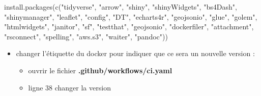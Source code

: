 \documentclass[
  letterpaper,
  DIV=11,
  numbers=noendperiod]{scrreprt}
\newenvironment{Shaded}{\begin{snugshade}}{\end{snugshade}}
\newcommand{\AttributeTok}[1]{\textcolor[rgb]{0.40,0.45,0.13}{#1}}
\newcommand{\CommentTok}[1]{\textcolor[rgb]{0.37,0.37,0.37}{#1}}
\newcommand{\FunctionTok}[1]{\textcolor[rgb]{0.28,0.35,0.67}{#1}}
\newcommand{\NormalTok}[1]{\textcolor[rgb]{0.00,0.23,0.31}{#1}}
\newcommand{\StringTok}[1]{\textcolor[rgb]{0.13,0.47,0.30}{#1}}
\providecommand{\tightlist}{%
  \setlength{\itemsep}{0pt}\setlength{\parskip}{0pt}}\usepackage{longtable,booktabs,array}
\begin{document}
\begin{Shaded}
\begin{Highlighting}[]
\FunctionTok{install.packages}\NormalTok{(}\FunctionTok{c}\NormalTok{(}\StringTok{"tidyverse"}\NormalTok{, }\StringTok{"arrow"}\NormalTok{, }\StringTok{"shiny"}\NormalTok{, }\StringTok{"shinyWidgets"}\NormalTok{, }\StringTok{"bs4Dash"}\NormalTok{, }\StringTok{"shinymanager"}\NormalTok{, }\StringTok{"leaflet"}\NormalTok{, }\StringTok{"config"}\NormalTok{, }\StringTok{"DT"}\NormalTok{, }\StringTok{"echarts4r"}\NormalTok{, }\StringTok{"geojsonio"}\NormalTok{, }\StringTok{"glue"}\NormalTok{, }\StringTok{"golem"}\NormalTok{, }\StringTok{"htmlwidgets"}\NormalTok{, }\StringTok{"janitor"}\NormalTok{, }\StringTok{"sf"}\NormalTok{, }\StringTok{"testthat"}\NormalTok{, }\StringTok{"geojsonio"}\NormalTok{, }\StringTok{"dockerfiler"}\NormalTok{, }\StringTok{"attachment"}\NormalTok{, }\StringTok{"rsconnect"}\NormalTok{, }\StringTok{"spelling"}\NormalTok{, }\StringTok{"aws.s3"}\NormalTok{, }\StringTok{"waiter"}\NormalTok{, }\StringTok{"pandoc"}\NormalTok{))}
\end{Highlighting}
\end{Shaded}

\begin{itemize}
\tightlist
\item
  changer l'étiquette du docker pour indiquer que ce sera un nouvelle
  version :

  \begin{itemize}
  \tightlist
  \item
    ouvrir le fichier \textbf{.github/workflows/ci.yaml}\\
  \item
    ligne 38 changer la version
  \end{itemize}
\end{itemize}

\begin{Shaded}
\end{Shaded}
\end{document}
